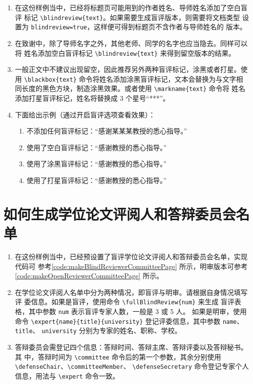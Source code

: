 \documentclass[lang=chs, degree=phd, blindreview=false, winfonts=true, academic=true]{yanputhesis}
\begin{document}
\begin{enumerate}
    \setlength{\itemsep}{0pt}
    \item 在这份样例当中，已经将标题页可能用到的作者姓名、导师姓名添加了空白盲评
          标记 \lstinline`\blindreview{text}`。如果需要生成盲评版本，则需要将文档类型
          设置为 \lstinline`blindreview=true`，这样便可得到标题页不含作者与导师姓名的
          版本。
    \item 在致谢中，除了导师名字之外，其他老师、同学的名字也应当隐去。同样可以将
          姓名添加空白盲评标记 \lstinline`\blindreview{text}` 来得到留空版本的结果。
    \item 一般正文中不建议出现留空，因此推荐另外两种盲评标记，涂黑或者打星。使用
          \lstinline`\blackbox{text}` 命令将姓名添加涂黑盲评标记，文本会替换为与文字相
          同长度的黑色方块，制造涂黑效果。或者使用 \lstinline`\markname{text}` 命令将
          姓名添加打星盲评标记，姓名将替换成 3 个星号“***”。
    \item 下面给出示例（通过开启盲评选项查看效果）：
          \begin{enumerate}
              \setlength{\itemsep}{0pt}
              \item 不添加任何盲评标记：“感谢某某某教授的悉心指导。”
              \item 使用了空白盲评标记：“感谢教授的悉心指导。”
              \item 使用了涂黑盲评标记：“感谢教授的悉心指导。”
              \item 使用了打星盲评标记：“感谢教授的悉心指导。”
          \end{enumerate}
\end{enumerate}

\section{如何生成学位论文评阅人和答辩委员会名单}

\begin{enumerate}
    \setlength{\itemsep}{0pt}
    \item 在这份样例当中，已经预设置了盲评学位论文评阅人和答辩委员会名单，实现代码可
          参考\autoref{code:makeBlindReviewerCommitteePage} 所示，明审版本可参考
          \autoref{code:makeOpenReviewerCommitteePage} 所示。
    \item 在学位论文评阅人名单中分为两种情况，即盲评与明审。请根据自身情况填写评
          委信息。如果是盲评，使用命令 \lstinline`\fullBlindReview{num}` 来生成
          盲评表格，其中参数 \lstinline`num` 表示盲评专家人数，一般是 3 或 5 人。
          如果是明审，使用命令 \lstinline`\expert{name}{title}{university}`
          登记评委信息，其中参数 \lstinline`name`、\lstinline`title`、
          \lstinline`university` 分别为专家的姓名、职称、学校。
    \item 答辩委员会需登记四个信息：答辩时间、答辩主席、答辩评委以及答辩秘书。其
          中，答辩时间为 \lstinline`\committee` 命令后的第一个参数，其余分别使用
          \lstinline`\defenseChair`、\lstinline`\committeeMember`、
          \lstinline`\defenseSecretary` 命令登记专家个人信息，用法与
          \lstinline`\expert` 命令一致。
\end{enumerate}
\end{document}
